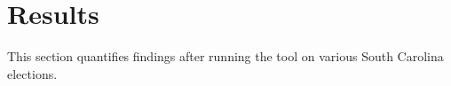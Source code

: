 \section{Results}
This section quantifies findings after running the tool on various South Carolina elections.
